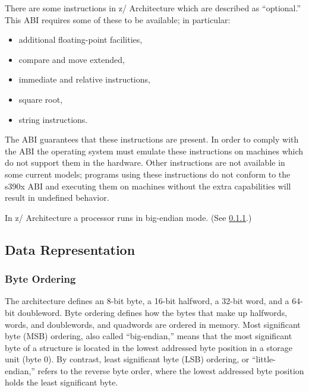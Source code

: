 \documentclass[english,11pt,twoside,toc=bib,toc=idx]{scrreprt}
\newcommand{\ABINAME}{s390x}
\newcommand{\ARCH}{z/\kern-1pt Ar\-chi\-tec\-ture}
\newcommand{\ARCHarch}{\ARCH}
\newcommand{\ABINAME}{s390}
\newcommand{\ARCH}{ESA/390}
\newcommand{\ARCHarch}{the \ARCH{} ar\-chi\-tec\-ture}
\begin{document}
{\ifzseries\else
  There are some instructions in \ARCHarch{}
  which are described as ``optional.''  This ABI
  requires some of these to be available; in particular:
  \begin{itemize}
  \item additional floating-point facilities, %
  \item compare and move extended,
  \item immediate and relative instructions,
  \item square root,
  \item string instructions.
  \end{itemize}

  The ABI guarantees that these instructions are present.  In order to
  comply with the ABI the operating system must emulate these
  instructions on machines which do not support them in the hardware.
  Other instructions are not available in some current models; programs
  using these instructions do not conform to the \ABINAME{} ABI and
  executing them on machines without the extra capabilities will result
  in undefined behavior.  \fi}

In \ARCHarch{} a
processor runs in big-endian mode.  (See \cref{byteordering}.)

\subsection{Data Representation}
\subsubsection{Byte Ordering}
\label{byteordering}

The architecture defines an 8-bit byte,
a 16-bit halfword,
a 32-bit word,{\ifzseries\else{} and\fi}
a 64-bit doubleword.
Byte ordering defines how the bytes that make up halfwords,
words,{\ifzseries\else{} and\fi} doublewords{\ifzseries , and
  quadwords\fi} are ordered in memory.  Most significant byte (MSB)
ordering, also called ``big-endian,'' means that
the most significant byte
of a structure is located in the lowest addressed byte position in a
storage unit (byte 0).  By contrast, least significant byte (LSB)
ordering, or ``little-endian,'' refers to the
reverse byte order, where
the lowest addressed byte position holds the least significant byte.
\end{document}
